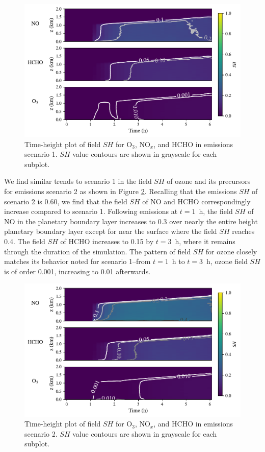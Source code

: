\begin{figure}[!t]
    \centering
    \includegraphics[width=.97\textwidth]{figures/chapter4/height-time-nsh-multivar-fx1fy0.pdf}
    \caption{Time-height plot of field $SH$ for O$_3$, NO$_x$, and HCHO in emissions scenario 1. $SH$ value contours are shown in grayscale for each subplot.}
    \label{fig:atmos-sh-s1}
 \end{figure}
 
We find similar trends to scenario 1 in the field $SH$ of ozone and its precursors for emissions scenario 2 as shown in Figure \ref{fig:atmos-sh-s2}. Recalling that the emissions $SH$ of scenario 2 is 0.60, we find that the field $SH$ of NO and HCHO correspondingly increase compared to scenario 1. Following emissions at $t=1$~h, the field $SH$ of NO in the planetary boundary layer increases to 0.3 over nearly the entire height planetary boundary layer except for near the surface where the field $SH$ reaches 0.4. The field $SH$ of HCHO increases to 0.15 by $t=3$~h, where it remains through the duration of the simulation. The pattern of field $SH$ for ozone closely matches its behavior noted for scenario 1--from $t=1$~h to $t=3$~h, ozone field $SH$ is of order 0.001, increasing to 0.01 afterwards.

\begin{figure}[!t]
    \centering
    \includegraphics[width=.97\textwidth]{figures/chapter4/height-time-nsh-multivar-road-10x.pdf}
    \caption{Time-height plot of field $SH$ for O$_3$, NO$_x$, and HCHO in emissions scenario 2. $SH$ value contours are shown in grayscale for each subplot.}
    \label{fig:atmos-sh-s2}
\end{figure}

